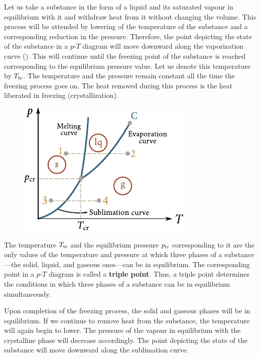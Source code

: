 Let us take a substance in the form of a liquid and its saturated vapour in equilibrium with it and withdraw heat from it without changing the volume. This process will be attended by lowering of the temperature of the substance and a corresponding reduction in the pressure. Therefore, the point depicting the state of the substance in a $p$-$T$ diagram will move downward along the vaporization curve (). This will continue until the freezing point of the substance is reached corresponding to the equilibrium pressure value. Let us denote this temperature by $T_{\text{tr}}$. The temperature and the pressure remain constant all the time the freezing process goes on. The heat removed during this process is the heat liberated in freezing (crystallization).

\begin{figure}[t]
	\begin{center}
		\includegraphics[scale=1]{figures/ch_15/fig_15_16.pdf}
		\caption[]{}
		\label{fig:15_16}
	\end{center}
	\vspace{-0.8cm}
\end{figure}

The temperature $T_{\text{tr}}$ and the equilibrium pressure $p_{\text{tr}}$ corresponding to it are the only values of the temperature and pressure at which three phases of a substance ---the solid, liquid, and gaseous
ones---can be in equilibrium. The corresponding point in a $p$-$T$ diagram is called a \textbf{triple point}. Thus, a triple point determines the conditions in which three phases of a substance can be in equilibrium simultaneously.

Upon completion of the freezing process, the solid and gaseous phases will be in equilibrium. If we continue to remove heat from the substance, the temperature will again begin to lower. The pressure of the vapour in equilibrium with the crystalline phase will decrease accordingly. The point depicting the state of the substance will move downward along the sublimation curve.

